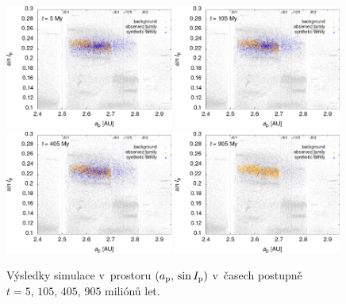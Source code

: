 \documentclass[A4paper, 12pt, oneside]{book}
\begin{document}
\immediate{}
\immediate{}
\immediate{}
\immediate{}
\begin{figure}
	\centering
	\includegraphics[width=0.49\textwidth]{obr/ai_5t.png}
	\includegraphics[width=0.49\textwidth]{obr/ai_105t.png}\\
	\includegraphics[width=0.49\textwidth]{obr/ai_405t.png}
	\includegraphics[width=0.49\textwidth]{obr/ai_905t.png}
	\caption{Výsledky simulace v~prostoru $(a_{\rm p},\,\sin I_{\rm p})$ v~časech postupně $t=5,\,105,\,405,\,905$ miliónů let.} \label{fig:ai_sim}
\end{figure}
\end{document}
